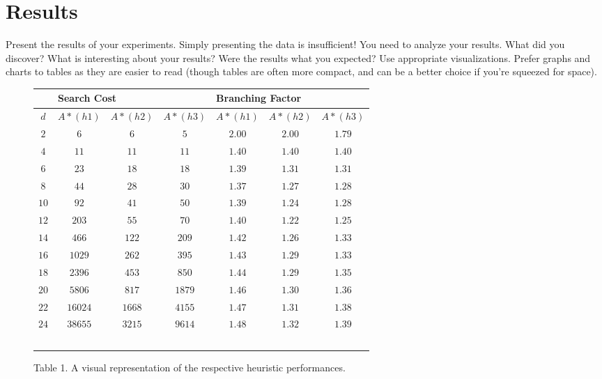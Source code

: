 
\section{Results}
\label{sec:results}

Present the results of your experiments. Simply presenting the data is
insufficient! You need to analyze your results. What did you discover?
What is interesting about your results? Were the results what you
expected? Use appropriate visualizations. Prefer graphs and charts to
tables as they are easier to read (though tables are often more
compact, and can be a better choice if you're squeezed for space).


\begin{figure}[htb]
  \centering %

  \begin{tabular}{|c|c|c|c|c|c|c|} 
    \hline \hline %
    \rule{0pt}{4ex}   & \multicolumn{3}{l}{Search Cost} &
                               \multicolumn{3}{l}{Branching Factor}\\ %
    \hline %
   \rule{0pt}{4ex} $d$ & $A*(h1)$ & $A*(h2)$ & 
                           $A*(h3)$ & $A*(h1)$ & $A*(h2)$ & $A*(h3)$\\
    \hline
   \rule{0pt}{4ex} $2$ & $6$ & $6$ & $5$ & $2.00$ & $2.00$ & $1.79$\\
    $4$ & $11$ & $11$ & $11$ & $1.40$ & $1.40$ & $1.40$\\
    $6$ & $23$ & $18$ & $18$ & $1.39$ & $1.31$ & $1.31$\\
    $8$ & $44$ & $28$ & $30$ & $1.37$ & $1.27$ & $1.28$\\
    $10$ & $92$ & $41$ & $50$ & $1.39$ & $1.24$ & $1.28$\\
    $12$ & $203 $ & $55$ & $70$ & $1.40$ & $1.22$ & $1.25$\\
    $14$ & $466 $ & $122$ & $209$ & $1.42$ & $1.26$ & $1.33$\\
    $16$ & $1029 $ & $262$ & $395$ & $1.43$ & $1.29$ & $1.33$\\
    $18$ & $2396 $ & $453$ & $850$ & $1.44$ & $1.29$ & $1.35$\\
    $20$ & $5806 $ & $817$ & $1879$ & $1.46$ & $1.30$ & $1.36$\\
    $22$ & $16024 $ & $1668$ & $4155$ & $1.47$ & $1.31$ & $1.38$\\
    $24$ & $38655$ & $3215$ & $9614$ & $1.48$ & $1.32$ & $1.39$\\
    $ $ & $ $ & $ $ & $ $ & $ $ & $ $ & $ $\\
    \hline \hline
  \end{tabular}

  \caption{Table 1. A visual representation of the respective heuristic performances.}
  \label{tab:example}

\end{figure}

